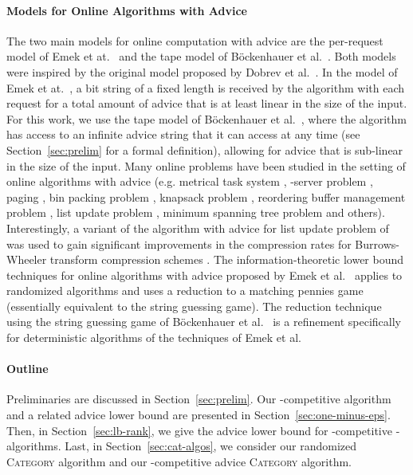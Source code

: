 \documentclass[a4paper]{article}
\begin{document}
\paragraph*{Models for Online Algorithms with Advice}
The two main models for online computation with advice are the per-request model of Emek
et at.~\cite{efkr11} and the tape model of B\"{o}ckenhauer et al.~\cite{bkkkm09}.
Both models were inspired by the original model proposed by Dobrev et al.~\cite{DRP2008}.
In the model of Emek et at.~\cite{efkr11}, a bit string of a fixed length is received by the
algorithm with each request for a total amount of advice that is at least linear in the size of
the input. For this work, we use the tape model of B\"{o}ckenhauer et al.~\cite{bkkkm09}, where the
algorithm has access to an infinite advice string that it can access at any time (see
Section~\ref{sec:prelim} for a formal definition), allowing for advice that is sub-linear in
the size of the input. Many online problems have been studied in the setting of online algorithms
with advice (e.g. metrical task system \cite{efkr11}, -server
problem \cite{efkr11,bkkk11,RenaultR15,GuptaKL13}, paging \cite{DRP2008,bkkkm09}, bin packing
problem \cite{RenaultRS15,BoyarKLL16,adkrr15}, knapsack problem \cite{BockKKR14}, reordering buffer management
problem \cite{arrs13}, list update problem \cite{BoyarKLL14}, minimum spanning tree
problem \cite{BianchiBBKP16} and others). Interestingly, a variant of the algorithm with advice for
list update problem of \cite{BoyarKLL14} was used to gain significant improvements in the compression
rates for Burrows-Wheeler transform compression schemes \cite{KamaliL14}.
The information-theoretic lower bound techniques for online algorithms with advice proposed by
Emek et al.~\cite{efkr11} applies to randomized algorithms and uses a reduction to a matching
pennies game (essentially equivalent to the string guessing game). The reduction technique using the string
guessing game of B\"{o}ckenhauer et al.~\cite{bhkkss14} is a refinement specifically for deterministic
algorithms of the techniques of Emek et al.


\paragraph*{Outline} Preliminaries are discussed in Section~\ref{sec:prelim}. Our
-competitive algorithm and a related advice lower bound are presented in
Section~\ref{sec:one-minus-eps}. Then, in Section~\ref{sec:lb-rank}, we give the advice lower
bound for -competitive -algorithms. Last, in Section~\ref{sec:cat-algos}, we consider our randomized \textsc{Category} algorithm
and our -competitive advice \textsc{Category} algorithm.
\end{document}
